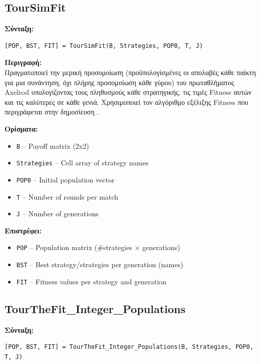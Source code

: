 \documentclass[12pt]{report}
\begin{document}
\subsection*{TourSimFit}

\textbf{\foreignlanguage{greek}{Σύνταξη}:}
\begin{verbatim}
[POP, BST, FIT] = TourSimFit(B, Strategies, POP0, T, J)
\end{verbatim}

\textbf{\foreignlanguage{greek}{Περιγραφή:}} \\
\foreignlanguage{greek}{
Πραγματοποιεί την μερική προσομοίωση (προϋπολογίσμένες οι απολαβές κάθε παίκτη για μια συνάντηση, όχι πλήρης προσομοίωση κάθε γύρου) του πρωταθλήματος \foreignlanguage{english}{Axelrod} υπολογίζοντας τους πληθυσμούς κάθε στρατηγικής, τις τιμές \foreignlanguage{english}{Fitness} αυτών και τις καλύτερες σε κάθε γενιά. Χρησιμοποιεί τον αλγόριθμο εξέλιξης \foreignlanguage{english}{Fitness} που περιγράφεται στην δημοσίευση \cite{mathieu1999}.}

\textbf{\foreignlanguage{greek}{Ορίσματα:}}
\begin{itemize}
    \item \texttt{B} – Payoff matrix (2x2)
    \item \texttt{Strategies} – Cell array of strategy names
    \item \texttt{POP0} – Initial population vector
    \item \texttt{T} – Number of rounds per match
    \item \texttt{J} – Number of generations
\end{itemize}

\textbf{\foreignlanguage{greek}{Επιστρέφει}:}
\begin{itemize}
    \item \texttt{POP} – Population matrix (\#strategies × generations)
    \item \texttt{BST} – Best strategy/strategies per generation (names)
    \item \texttt{FIT} – Fitness values per strategy and generation
\end{itemize}

\subsection*{TourTheFit\_Integer\_Populations}

\textbf{\foreignlanguage{greek}{Σύνταξη}:}
\begin{verbatim}
[POP, BST, FIT] = TourTheFit_Integer_Populations(B, Strategies, POP0, T, J)
\end{verbatim}
\end{document}

